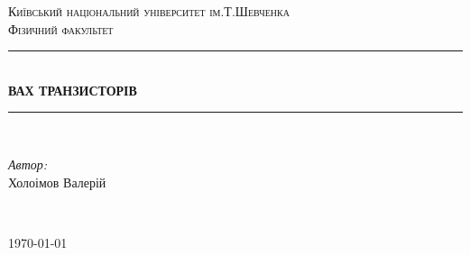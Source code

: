 \center
\newcommand{\HRule}{\rule{\linewidth}{0.3 mm}} %
\textsc{\Large Київський національний університет ім.Т.Шевченка }\\[1.5cm] %
\textsc{\Large Фізичний факультет}\\[2.5cm] %


\HRule \\[0.4cm]
{ \huge \bfseries ВАХ ТРАНЗИСТОРІВ
}\\[0.4cm] %
\HRule \\[1.5cm]

\flushright
\begin{minipage}{0.4\textwidth}
\large
\emph{Автор:}\\ Холоімов Валерій %
\end{minipage}\\[12cm]
\center

{\large \today}\\[0cm] %
\flushleft
